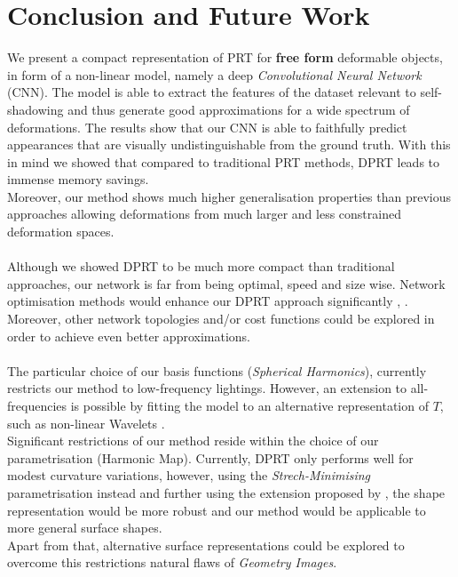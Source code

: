 \section{Conclusion and Future Work}
We present a compact representation of PRT for \textbf{free form} deformable objects, in form of a non-linear model, namely a deep \textit{Convolutional Neural Network} (CNN).  The model is able to extract the features of the dataset relevant to self-shadowing and thus generate good approximations for a wide spectrum of deformations. The results show that our CNN is able to faithfully predict appearances that are visually undistinguishable from the ground truth.  With this in mind we showed that compared to traditional PRT methods, DPRT leads to immense memory savings.
\\ 
Moreover, our method shows much higher generalisation properties than previous approaches allowing deformations from much larger and less constrained deformation spaces.\\
\\
Although we showed DPRT to be much more compact than traditional approaches, our network is far from being optimal, speed and size wise. Network optimisation methods would enhance our DPRT approach significantly \cite{Survey_NN_Compression}, \cite{Deep_Compression}.
Moreover, other network topologies and/or cost functions could be explored in order to achieve even better approximations.\\
\\
The particular choice of our basis functions (\textit{Spherical Harmonics}), currently restricts our method to low-frequency lightings. However, an extension to all-frequencies is possible by fitting the model to an alternative representation of $T$, such as non-linear Wavelets \cite{AllFrequencyPRT}.
\\
Significant restrictions of our method reside within the choice of our parametrisation (Harmonic Map).  Currently, DPRT only performs well for modest curvature variations, however, using the \textit{Strech-Minimising} parametrisation instead and further using the extension proposed by \cite{Spherical_Parametrization}, the shape representation would be more robust and our method would be applicable to more general surface shapes. \\
Apart from that, alternative surface representations could be explored to overcome this restrictions natural flaws of \textit{Geometry Images}. 

